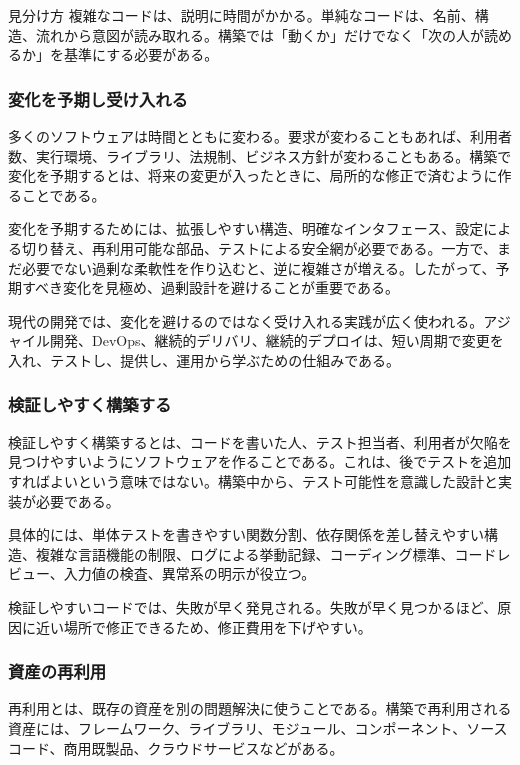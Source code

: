 \begin{keybox}{見分け方}
複雑なコードは、説明に時間がかかる。単純なコードは、名前、構造、流れから意図が読み取れる。構築では「動くか」だけでなく「次の人が読めるか」を基準にする必要がある。
\end{keybox}

\subsubsection{変化を予期し受け入れる}

多くのソフトウェアは時間とともに変わる。要求が変わることもあれば、利用者数、実行環境、ライブラリ、法規制、ビジネス方針が変わることもある。構築で変化を予期するとは、将来の変更が入ったときに、局所的な修正で済むように作ることである。

変化を予期するためには、拡張しやすい構造、明確なインタフェース、設定による切り替え、再利用可能な部品、テストによる安全網が必要である。一方で、まだ必要でない過剰な柔軟性を作り込むと、逆に複雑さが増える。したがって、予期すべき変化を見極め、過剰設計を避けることが重要である。

現代の開発では、変化を避けるのではなく受け入れる実践が広く使われる。アジャイル開発、DevOps、継続的デリバリ、継続的デプロイは、短い周期で変更を入れ、テストし、提供し、運用から学ぶための仕組みである。

\subsubsection{検証しやすく構築する}

検証しやすく構築するとは、コードを書いた人、テスト担当者、利用者が欠陥を見つけやすいようにソフトウェアを作ることである。これは、後でテストを追加すればよいという意味ではない。構築中から、テスト可能性を意識した設計と実装が必要である。

具体的には、単体テストを書きやすい関数分割、依存関係を差し替えやすい構造、複雑な言語機能の制限、ログによる挙動記録、コーディング標準、コードレビュー、入力値の検査、異常系の明示が役立つ。

検証しやすいコードでは、失敗が早く発見される。失敗が早く見つかるほど、原因に近い場所で修正できるため、修正費用を下げやすい。

\subsubsection{資産の再利用}

再利用とは、既存の資産を別の問題解決に使うことである。構築で再利用される資産には、フレームワーク、ライブラリ、モジュール、コンポーネント、ソースコード、商用既製品、クラウドサービスなどがある。

